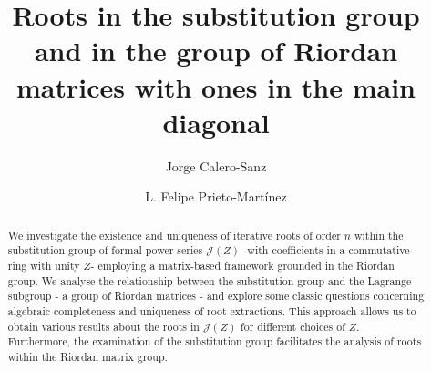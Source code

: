 \documentclass[preprint,12pt]{elsarticle}
\begin{document}
\begin{frontmatter}



\title{Roots in the substitution group and in the group of Riordan matrices with ones in the main diagonal}


\author[inst1]{Jorge Calero-Sanz}

\author[inst1]{L. Felipe Prieto-Martínez}
\begin{abstract}
We investigate the existence and uniqueness of iterative roots of order $n$ within the substitution group of formal power series $\mathcal J(Z)$ -with coefficients in a commutative ring with unity $Z$-   employing a matrix-based framework grounded in the Riordan group. We analyse the relationship between the substitution group and the Lagrange subgroup - a group of Riordan matrices - and explore some classic questions concerning algebraic completeness and uniqueness of root extractions. This approach allows us to obtain various results about the roots in $\mathcal J(Z)$ for different choices of $Z$. Furthermore, the examination of the substitution group facilitates the analysis of roots within the Riordan matrix group.
\end{abstract}


\end{frontmatter}
\end{document}
